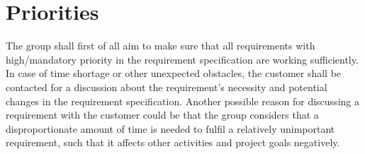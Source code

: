 \section{Priorities}
The group shall first of all aim to make sure that all requirements with high/mandatory priority in the requirement specification are working sufficiently. In case of time shortage or other unexpected obstacles, the customer shall be contacted for a discussion about the requirement’s necessity and potential changes in the requirement specification. Another possible reason for discussing a requirement with the customer could be that the group considers that a disproportionate amount of time is needed to fulfil a relatively unimportant requirement, such that it affects other activities and project goals negatively.
